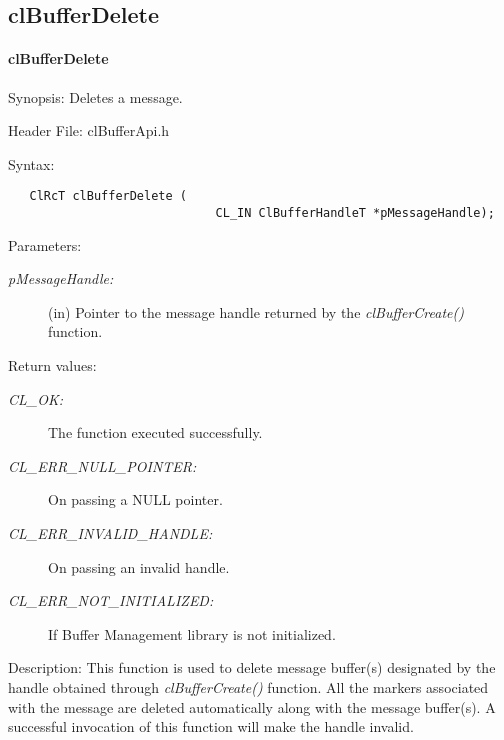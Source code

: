 \subsection{clBufferDelete} 
\hypertarget{pagebuf105}{}\paragraph{cl\-Buffer\-Delete}\label{pagebuf105}
\begin{Desc}
\item[Synopsis:]Deletes a message.\end{Desc}
\begin{Desc}
\item[Header File:]clBufferApi.h\end{Desc}
\begin{Desc}
\item[Syntax:]

\footnotesize\begin{verbatim}   ClRcT clBufferDelete (
                             CL_IN ClBufferHandleT *pMessageHandle);
\end{verbatim}
\normalsize
\end{Desc}
\begin{Desc}
\item[Parameters:]
\begin{description}
\item[{\em p\-Message\-Handle:}](in) Pointer to the message handle returned by the \textit{clBufferCreate()} 
function.\end{description}
\end{Desc}
\begin{Desc}
\item[Return values:]
\begin{description}
\item[{\em CL\_\-OK:}]The function executed successfully. \item[{\em CL\_\-ERR\_\-NULL\_\-POINTER:}]On passing a NULL pointer. \item[{\em CL\_\-ERR\_\-INVALID\_\-HANDLE:}]On passing an invalid handle. \item[{\em CL\_\-ERR\_\-NOT\_\-INITIALIZED:}]If Buffer Management library is not initialized.\end{description}
\end{Desc}
\begin{Desc}
\item[Description:]This function is used to delete message buffer(s) designated by the handle obtained through 
\textit{clBufferCreate()} function. All the markers associated with the message are deleted automatically 
along with the message buffer(s). A successful invocation of this function will make the handle invalid.\end{Desc}
